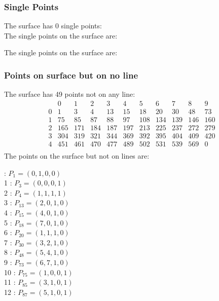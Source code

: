 \documentclass{article}
\begin{document}
{\subsubsection*{Single Points}
The surface has 0 single points:\\
The single points on the surface are:\\
\begin{multicols}{2}
\noindent
\end{multicols}
The single points on the surface are:\\
\subsubsection*{Points on surface but on no line}
The surface has 49 points not on any line:\\
$$
\begin{array}{r|*{10}{r}}
 & 0 & 1 & 2 & 3 & 4 & 5 & 6 & 7 & 8 & 9\\
\hline
0 & 1 & 3 & 4 & 13 & 15 & 18 & 20 & 30 & 48 & 73\\
1 & 75 & 85 & 87 & 88 & 97 & 108 & 134 & 139 & 146 & 160\\
2 & 165 & 171 & 184 & 187 & 197 & 213 & 225 & 237 & 272 & 279\\
3 & 304 & 319 & 321 & 344 & 369 & 392 & 395 & 404 & 409 & 420\\
4 & 451 & 461 & 470 & 477 & 489 & 502 & 531 & 539 & 569 & 0\\
\end{array}
$$
The points on the surface but not on lines are:\\
\begin{multicols}{2}
 : $P_{1}=( 0, 1, 0, 0 )$\\
1 : $P_{3}=( 0, 0, 0, 1 )$\\
2 : $P_{4}=( 1, 1, 1, 1 )$\\
3 : $P_{13}=( 2, 0, 1, 0 )$\\
4 : $P_{15}=( 4, 0, 1, 0 )$\\
5 : $P_{18}=( 7, 0, 1, 0 )$\\
6 : $P_{20}=( 1, 1, 1, 0 )$\\
7 : $P_{30}=( 3, 2, 1, 0 )$\\
8 : $P_{48}=( 5, 4, 1, 0 )$\\
9 : $P_{73}=( 6, 7, 1, 0 )$\\
10 : $P_{75}=( 1, 0, 0, 1 )$\\
11 : $P_{85}=( 3, 1, 0, 1 )$\\
12 : $P_{87}=( 5, 1, 0, 1 )$\\

\end{multicols}}
\end{document}
